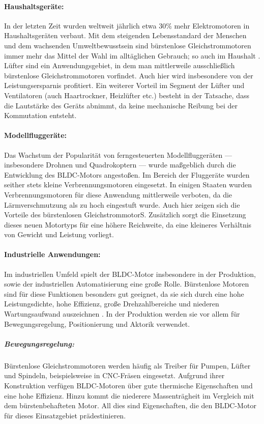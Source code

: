 \paragraph{Haushaltsgeräte:} In der letzten Zeit wurden weltweit jährlich etwa 30\% mehr Elektromotoren in Haushaltsgeräten verbaut. Mit dem steigenden Lebensstandard der Menschen und dem wachsenden Umweltbewusstsein sind bürstenlose Gleichstrommotoren immer mehr das Mittel der Wahl im alltäglichen Gebrauch; so auch im Haushalt \parencite[S. 6]{Xia2012}. Lüfter sind ein Anwendungsgebiet, in dem man mittlerweile ausschließlich bürstenlose Gleichstrommotoren vorfindet. Auch hier wird insbesondere von der Leistungsersparnis profitiert. Ein weiterer Vorteil im Segment der Lüfter und Ventilatoren (auch Haartrockner, Heizlüfter etc.) besteht in der Tatsache, dass die Lautstärke des Geräts abnimmt, da keine mechanische Reibung bei der Kommutation entsteht.

\paragraph{Modellfluggeräte:} Das Wachstum der Popularität von ferngesteuerten Modellfluggeräten --- insbesondere Drohnen und Quadrokoptern --- wurde maßgeblich durch die Entwicklung des BLDC-Motors angestoßen. Im Bereich der Fluggeräte wurden seither stets kleine Verbrennungsmotoren eingesetzt. In einigen Staaten wurden Verbrennungsmotoren für diese Anwendung mittlerweile verboten, da die Lärmverschmutzung als zu hoch eingestuft wurde. Auch hier zeigen sich die Vorteile des bürstenlosen GleichstrommotorS.  Zusätzlich sorgt die Einsetzung dieses neuen Motortyps für eine höhere Reichweite, da eine kleineres Verhältnis von Gewicht und Leistung vorliegt.

\paragraph{Industrielle Anwendungen:} Im industriellen Umfeld spielt der BLDC-Motor insbesondere in der Produktion, sowie der industriellen Automatisierung eine große Rolle. Bürstenlose Motoren sind für diese Funktionen besonders gut geeignet, da sie sich durch eine hohe Leistungsdichte, hohe Effizienz, große Drehzahlbereiche und niederen Wartungsaufwand auszeichnen \parencite[S. 8]{Xia2012}. In der Produktion werden sie vor allem für Bewegungsregelung, Positionierung und Aktorik verwendet.

\subparagraph{Bewegungsregelung:} Bürstenlose Gleichstrommotoren werden häufig als Treiber für Pumpen, Lüfter und Spindeln, beispielsweise in CNC-Fräsen eingesetzt. Aufgrund ihrer Konstruktion verfügen BLDC-Motoren über gute thermische Eigenschaften und eine hohe Effizienz. Hinzu kommt die niederere Massenträgheit im Vergleich mit dem bürstenbehafteten Motor. All dies sind Eigenschaften, die den BLDC-Motor für dieses Einsatzgebiet prädestinieren.

